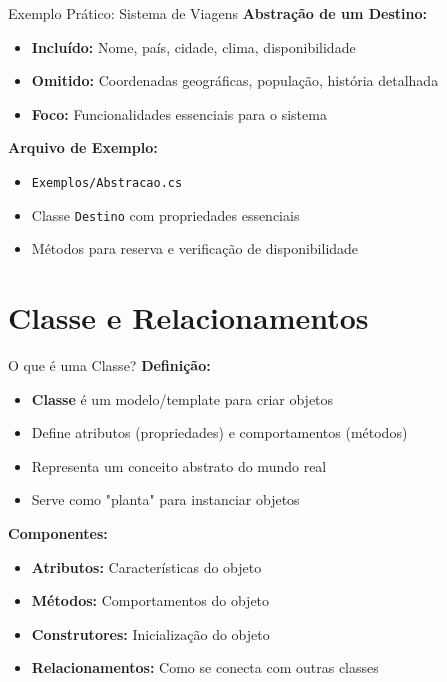 \documentclass[aspectratio=169]{beamer}
\begin{document}
\begin{frame}{Exemplo Prático: Sistema de Viagens}
\textbf{Abstração de um Destino:}
\begin{itemize}
    \item \textbf{Incluído:} Nome, país, cidade, clima, disponibilidade
    \item \textbf{Omitido:} Coordenadas geográficas, população, história detalhada
    \item \textbf{Foco:} Funcionalidades essenciais para o sistema
\end{itemize}

\textbf{Arquivo de Exemplo:}
\begin{itemize}
    \item \texttt{Exemplos/Abstracao.cs}
    \item Classe \texttt{Destino} com propriedades essenciais
    \item Métodos para reserva e verificação de disponibilidade
\end{itemize}
\end{frame}

\section{Classe e Relacionamentos}

\begin{frame}{O que é uma Classe?}
\textbf{Definição:}
\begin{itemize}
    \item \textbf{Classe} é um modelo/template para criar objetos
    \item Define atributos (propriedades) e comportamentos (métodos)
    \item Representa um conceito abstrato do mundo real
    \item Serve como "planta" para instanciar objetos
\end{itemize}

\textbf{Componentes:}
\begin{itemize}
    \item \textbf{Atributos:} Características do objeto
    \item \textbf{Métodos:} Comportamentos do objeto
    \item \textbf{Construtores:} Inicialização do objeto
    \item \textbf{Relacionamentos:} Como se conecta com outras classes
\end{itemize}
\end{frame}
\end{document}
